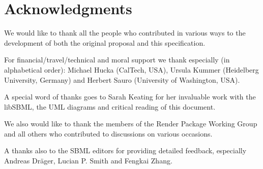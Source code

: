 
\section{Acknowledgments}

We would like to thank all the people who contributed in various ways to the development of both the original proposal and this specification.

For financial/travel/technical and moral support we thank especially (in alphabetical order): Michael Hucka (CalTech, USA), Ursula Kummer (Heidelberg University, Germany) and Herbert Sauro (University of Washington, USA).

A special word of thanks goes to Sarah Keating for her invaluable work with the \textsf{libSBML}, the UML diagrams and critical reading of this document.

We also would like to thank the members of the \textsf{Render Package Working Group} and all others who contributed to discussions on various occasions.

A thanks also to the SBML editors for providing detailed feedback, especially Andreas Dr\"ager, Lucian P. Smith and Fengkai Zhang. 

